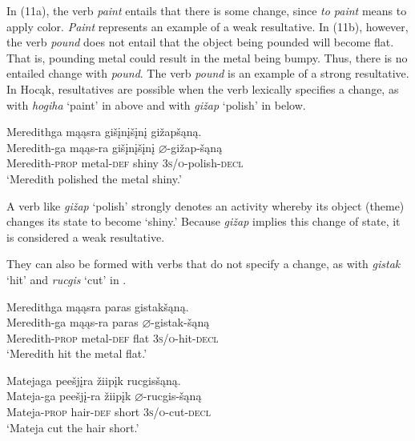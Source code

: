 \documentclass[output=paper]{LSP/langsci}
\begin{document}
\begin{exe}
\ex\label{ex:rosen:11}
\begin{xlist}



\end{xlist}
\end{exe}

In (11a), the verb \textit{paint} entails that there is some change, since \textit{to paint} means to apply color. \textit{Paint} represents an example of a weak resultative. In (11b), however, the verb \textit{pound} does not entail that the object being pounded will become flat. That is, pounding metal could result in the metal being bumpy. Thus, there is no entailed change with \textit{pound}. The verb \textit{pound} is an example of a strong resultative. In Hocąk, resultatives are possible when the verb lexically specifies a change, as with \textit{hogiha} `paint' in  above and with \textit{gižap} `polish' in  below.

\begin{exe}
\ex\label{ex:rosen:12}
 \glll Meredithga mąąsra gišįnįšįnį gižapšąną.  \\
 Meredith-ga mąąs-ra gišįnįšįnį {$\varnothing$}-gižap-šąną\\
 Meredith-\textsc{prop} metal-\textsc{def} shiny \textsc{3s/o}-polish-\textsc{decl}\\
\glt `Meredith polished the metal shiny.'

\end{exe}

A verb like \textit{gižap} `polish' strongly denotes an activity whereby its object (theme) changes its state to become `shiny.' Because \textit{gižap} implies this change of state, it is considered a weak resultative. 

They can also be formed with verbs that do not specify a change, as with \textit{gistak} `hit' and \textit{rucgis} `cut' in .

\begin{exe}
\ex\label{ex:rosen:13}
\begin{xlist}

\ex \glll Meredithga mąąsra paras gistakšąną. \\
 Meredith-ga mąąs-ra paras {$\varnothing$}-gistak-šąną\\
Meredith-\textsc{prop} metal-\textsc{def} flat \textsc{3s/o}-hit-\textsc{decl}\\
\glt `Meredith hit the metal flat.'

\ex \glll Matejaga peešjįra žiipįk rucgisšąną.\\
Mateja-ga peešjį-ra žiipįk {$\varnothing$}-rucgis-šąną\\
Mateja-\textsc{prop} hair-\textsc{def} short \textsc{3s/o}-cut-\textsc{decl}\\
\glt `Mateja cut the hair short.'

\end{xlist}
\end{exe}
\end{document}
